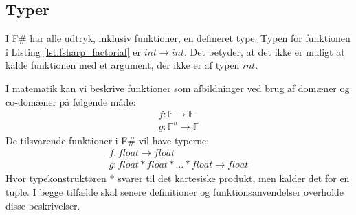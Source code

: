 \subsection{Typer}

I F\# har alle udtryk, inklusiv funktioner, en defineret type. Typen for funktionen i Listing \ref{lst:fsharp_factorial} er $int \rightarrow int$. Det betyder, at det ikke er muligt at kalde funktionen med et argument, der ikke er af typen $int$.

I matematik kan vi beskrive funktioner som afbildninger ved brug af domæner og co-domæner på følgende måde:
\begin{gather*}
    f: \mathbb{F} \to \mathbb{F} \\
    g: \mathbb{F}^n \to \mathbb{F}
\end{gather*}
De tilsvarende funktioner i F\# vil have typerne:
\begin{gather*}
    f: float \to float \\
    g: float * float * \ldots * float \to float
\end{gather*}
Hvor typekonstruktøren $*$ svarer til det kartesiske produkt, men kalder det for en tuple. I begge tilfælde skal senere definitioner og funktionsanvendelser overholde disse beskrivelser. 

